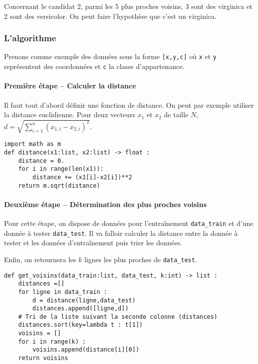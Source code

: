 {\begin{exemple}
Concernant le candidat 2, parmi les 5 plus proches voisins, 3 sont des virginica et 2 sont des versicolor. On peut faire l'hypothèse que c'est un virginica. 

\end{exemple}

\subsubsection{L'algorithme}

Prenons comme exemple des données sous la forme \texttt{[x,y,c]} où \texttt{x} et \texttt{y} représentent des coordonnées et \texttt{c} la classe d'appartenance.
\paragraph*{Première étape -- Calculer la distance}

Il faut tout d'abord définir une fonction de distance. On peut par exemple utiliser la distance euclidienne.
Pour deux vecteurs $x_1$ et $x_2$ de taille $N$, 
$d = \sqrt{ \sum\limits_{i=1}^n \left(x_{1,i}-x_{2,i} \right)^2}$.

\begin{lstlisting}
import math as m
def distance(x1:list, x2:list) -> float :
    distance = 0.
    for i in range(len(x1)):
        distance += (x1[i]-x2[i])**2
    return m.sqrt(distance)
\end{lstlisting}

\paragraph*{Deuxième étape -- Détermination des plus proches voisins}
Pour cette étape, on dispose de données pour l’entraînement \texttt{data\_train} et d'une donnée à tester \texttt{data\_test}.
Il va falloir calculer la distance entre la donnée à tester et les données d’entraînement puis trier les données. 

Enfin, on retournera les $k$ lignes les plus proches de \texttt{data\_test}.


\begin{lstlisting}
def get_voisins(data_train:list, data_test, k:int) -> list :
    distances =[]
    for ligne in data_train : 
        d = distance(ligne,data_test)
        distances.append([ligne,d])
    # Tri de la liste suivant la seconde colonne (distances)
    distances.sort(key=lambda t : t[1]) 
    voisins = []
    for i in range(k) :
        voisins.append(distance[i][0])
    return voisins
\end{lstlisting}

}
